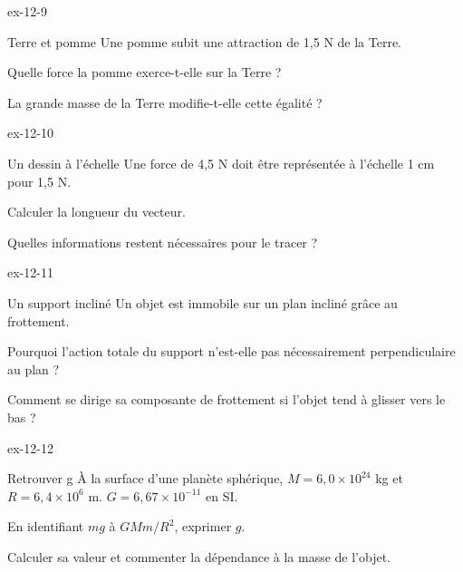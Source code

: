 \begin{blocLivre}{ex-12-9}\begin{exercice}[3]{Terre et pomme}
Une pomme subit une attraction de 1,5 N de la Terre.
\begin{questions}
\item Quelle force la pomme exerce-t-elle sur la Terre ?
\item La grande masse de la Terre modifie-t-elle cette égalité ?
\end{questions}
\end{exercice}\end{blocLivre}
\begin{blocLivre}{ex-12-10}\begin{exercice}[3]{Un dessin à l’échelle}
Une force de 4,5 N doit être représentée à l’échelle 1 cm pour 1,5 N.
\begin{questions}
\item Calculer la longueur du vecteur.
\item Quelles informations restent nécessaires pour le tracer ?
\end{questions}
\end{exercice}\end{blocLivre}
\begin{blocLivre}{ex-12-11}\begin{exercice}[3]{Un support incliné}
Un objet est immobile sur un plan incliné grâce au frottement.
\begin{questions}
\item Pourquoi l’action totale du support n’est-elle pas nécessairement perpendiculaire au plan ?
\item Comment se dirige sa composante de frottement si l’objet tend à glisser vers le bas ?
\end{questions}
\end{exercice}\end{blocLivre}
\begin{blocLivre}{ex-12-12}\begin{exercice}[3]{Retrouver g}
À la surface d’une planète sphérique, $M=6,0\times10^{24}$ kg et $R=6,4\times10^6$ m. $G=6,67\times10^{-11}$ en SI.
\begin{questions}
\item En identifiant $mg$ à $GMm/R^2$, exprimer $g$.
\item Calculer sa valeur et commenter la dépendance à la masse de l’objet.
\end{questions}
\end{exercice}\end{blocLivre}

